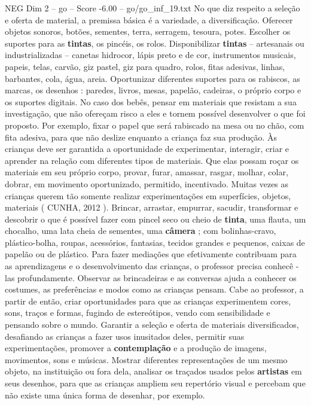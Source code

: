 \begin{textsample}{NEG Dim 2 – go – Score -6.00 – go/go\_inf\_19.txt}
No que diz respeito a seleção e oferta de material, a premissa básica é a variedade, a diversificação.
Oferecer objetos sonoros, botões, sementes, terra, serragem, tesoura, potes.
Escolher os suportes para as \textbf{tintas}, os pincéis, os rolos.
Disponibilizar \textbf{tintas} – artesanais ou industrializadas – canetas hidrocor, lápis preto e de cor, instrumentos musicais, papeis, telas, carvão, giz pastel, giz para quadro, rolos, fitas adesivas, linhas, barbantes, cola, água, areia.
Oportunizar diferentes suportes para os rabiscos, as marcas, os desenhos : paredes, livros, mesas, papelão, cadeiras, o próprio corpo e os suportes digitais.
No caso dos bebês, pensar em materiais que resistam a sua investigação, que não ofereçam risco a eles e tornem possível desenvolver o que foi proposto.
Por exemplo, fixar o papel que será rabiscado na mesa ou no chão, com fita adesiva, para que não deslize enquanto a criança faz sua produção.
Às crianças deve ser garantida a oportunidade de experimentar, interagir, criar e aprender na relação com diferentes tipos de materiais.
Que elas possam roçar os materiais em seu próprio corpo, provar, furar, amassar, rasgar, molhar, colar, dobrar, em movimento oportunizado, permitido, incentivado.
Muitas vezes as crianças querem tão somente realizar experimentações em superfícies, objetos, materiais ( CUNHA, 2012 ).
Brincar, arrastar, empurrar, sacudir, transformar e descobrir o que é possível fazer com pincel seco ou cheio de \textbf{tinta}, uma flauta, um chocalho, uma lata cheia de sementes, uma \textbf{câmera} ; com bolinhas-cravo, plástico-bolha, roupas, acessórios, fantasias, tecidos grandes e pequenos, caixas de papelão ou de plástico.
Para fazer mediações que efetivamente contribuam para as aprendizagens e o desenvolvimento das crianças, o professor precisa conhecê -las profundamente.
Observar as brincadeiras e as conversas ajuda a conhecer os costumes, as preferências e modos como as crianças pensam.
Cabe ao professor, a partir de então, criar oportunidades para que as crianças experimentem cores, sons, traços e formas, fugindo de estereótipos, vendo com sensibilidade e pensando sobre o mundo.
Garantir a seleção e oferta de materiais diversificados, desafiando as crianças a fazer usos inusitados deles, permitir suas experimentações, promover a \textbf{contemplação} e a produção de imagens, movimentos, sons e músicas.
Mostrar diferentes representações de um mesmo objeto, na instituição ou fora dela, analisar os traçados usados pelos \textbf{artistas} em seus desenhos, para que as crianças ampliem seu repertório visual e percebam que não existe uma única forma de desenhar, por exemplo.

\end{textsample}

